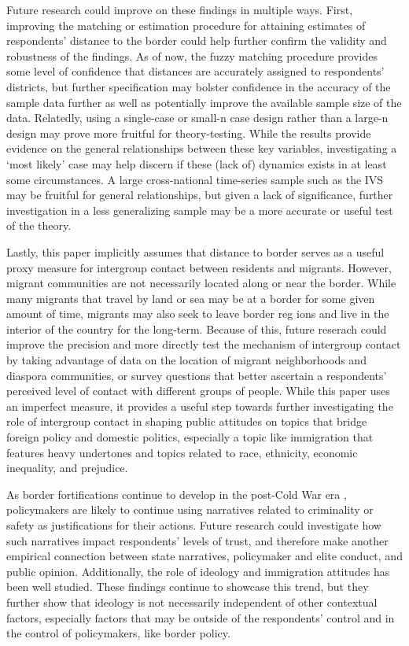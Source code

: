 \documentclass[12pt,]{article}
\begin{document}
Future research could improve on these findings in multiple ways. First,
improving the matching or estimation procedure for attaining estimates
of respondents' distance to the border could help further confirm the
validity and robustness of the findings. As of now, the fuzzy matching
procedure provides some level of confidence that distances are
accurately assigned to respondents' districts, but further specification
may bolster confidence in the accuracy of the sample data further as
well as potentially improve the available sample size of the data.
Relatedly, using a single-case or small-n case design rather than a
large-n design may prove more fruitful for theory-testing. While the
results provide evidence on the general relationships between these key
variables, investigating a `most likely' case may help discern if these
(lack of) dynamics exists in at least some circumstances. A large
cross-national time-series sample such as the IVS may be fruitful for
general relationships, but given a lack of significance, further
investigation in a less generalizing sample may be a more accurate or
useful test of the theory.

Lastly, this paper implicitly assumes that distance to border serves as
a useful proxy measure for intergroup contact between residents and
migrants. However, migrant communities are not necessarily located along
or near the border. While many migrants that travel by land or sea may
be at a border for some given amount of time, migrants may also seek to
leave border reg ions and live in the interior of the country for the
long-term. Because of this, future reserach could improve the precision
and more directly test the mechanism of intergroup contact by taking
advantage of data on the location of migrant neighborhoods and diaspora
communities, or survey questions that better ascertain a respondents'
perceived level of contact with different groups of people. While this
paper uses an imperfect measure, it provides a useful step towards
further investigating the role of intergroup contact in shaping public
attitudes on topics that bridge foreign policy and domestic politics,
especially a topic like immigration that features heavy undertones and
topics related to race, ethnicity, economic inequality, and prejudice.

As border fortifications continue to develop in the post-Cold War era
\citep{carter2017}, policymakers are likely to continue using narratives
related to criminality or safety as justifications for their actions.
Future research could investigate how such narratives impact
respondents' levels of trust, and therefore make another empirical
connection between state narratives, policymaker and elite conduct, and
public opinion. Additionally, the role of ideology and immigration
attitudes has been well studied. These findings continue to showcase
this trend, but they further show that ideology is not necessarily
independent of other contextual factors, especially factors that may be
outside of the respondents' control and in the control of policymakers,
like border policy.




\newpage
\singlespacing 
\renewcommand\refname{Bibliography}

\end{document}
